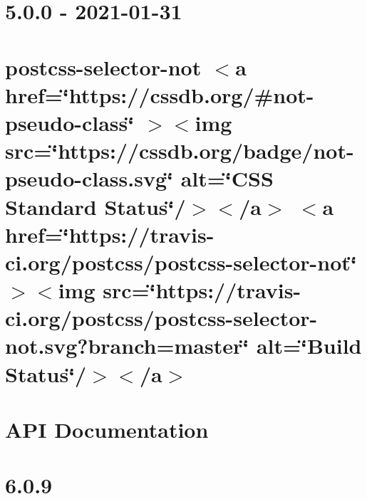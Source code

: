 \documentclass[twoside]{book}
\newcommand{\+}{\discretionary{\mbox{\scriptsize$\hookleftarrow$}}{}{}}
\begin{document}
\chapter{5.0.0 -\/ 2021-\/01-\/31}
\label{md__c___users_vaishnavi_jadhav__desktop__developer_code_mean_stack_example_client_node_modules_pde11492dc6038b77dc84bda41ad1ae08}

\chapter{postcss-\/selector-\/not \texorpdfstring{$<$}{<}a href=\char`\"{}https\+://cssdb.\+org/\#not-\/pseudo-\/class\char`\"{} \texorpdfstring{$>$}{>}\texorpdfstring{$<$}{<}img src=\char`\"{}https\+://cssdb.\+org/badge/not-\/pseudo-\/class.\+svg\char`\"{} alt=\char`\"{}\+CSS Standard Status\char`\"{}/\texorpdfstring{$>$}{>}\texorpdfstring{$<$}{<}/a\texorpdfstring{$>$}{>} \texorpdfstring{$<$}{<}a href=\char`\"{}https\+://travis-\/ci.\+org/postcss/postcss-\/selector-\/not\char`\"{} \texorpdfstring{$>$}{>}\texorpdfstring{$<$}{<}img src=\char`\"{}https\+://travis-\/ci.\+org/postcss/postcss-\/selector-\/not.\+svg?branch=master\char`\"{} alt=\char`\"{}\+Build Status\char`\"{}/\texorpdfstring{$>$}{>}\texorpdfstring{$<$}{<}/a\texorpdfstring{$>$}{>}}
\label{md__c___users_vaishnavi_jadhav__desktop__developer_code_mean_stack_example_client_node_modules_pe1cbc68eb5dbc0222ccf1400d1b59c25}

\chapter{API Documentation}
\label{md__c___users_vaishnavi_jadhav__desktop__developer_code_mean_stack_example_client_node_modules_postcss_selector_parser__a_p_i}

\chapter{6.0.9}
\label{md__c___users_vaishnavi_jadhav__desktop__developer_code_mean_stack_example_client_node_modules_pe9660623a763a5f1c3a232453479ea07}

\end{document}
